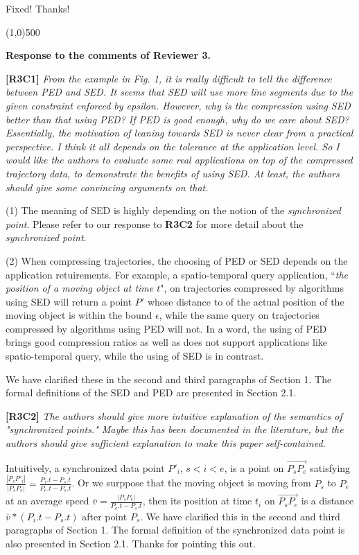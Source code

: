 \documentclass{letter}
\begin{document}
Fixed! Thanks!


\line(1,0){500}

\textbf{Response to the comments of Reviewer 3.}

\textbf{[R3C1]} \emph{From the example in Fig. 1, it is really difficult to tell the difference between PED and SED. It seems that SED will use more line segments due to the given constraint enforced by epsilon. However, why is the compression using SED better than that using PED? If PED is good enough, why do we care about SED? Essentially, the motivation of leaning towards SED is never clear from a practical perspective. I think it all depends on the tolerance at the application level. So I would like the authors to evaluate some real applications on top of the compressed trajectory data, to demonstrate the benefits of using SED. At least, the authors should give some convincing arguments on that.}

(1) The meaning of SED is highly depending on the notion of the \emph{synchronized point}. Please refer to our response to \textbf{R3C2} for more detail about the \emph{synchronized point}. 

(2) When compressing trajectories, the choosing of PED or SED depends on the application retuirements. For example, a spatio-temporal query application, ``\emph{the position of a moving object at time $t$}", on trajectories compressed by algorithms using SED will return a point $P'$ whose distance to of the actual position of the moving object is within the bound $\epsilon$, while the same query on trajectories compressed by algorithms using PED will not. In a word, the using of PED brings good compression ratios as well as does not support applications like spatio-temporal query, while the using of SED is in contrast.

We have clarified these in the second and third paragraphs of Section 1. 
The formal definitions of the SED and PED are presented in Section 2.1.


\textbf{[R3C2]} \emph{The authors should give more intuitive explanation of the semantics of "synchronized points." Maybe this has been documented in the literature, but the authors should give sufficient explanation to make this paper self-contained.}

Intuitively, a synchronized data point $P'_i$, $s<i<e$, is a point on $\overrightarrow{P_sP_{e}}$ satisfying $\frac{|P_sP'_i|}{|P_sP_e|} = \frac{P_i.t - P_s.t}{P_e.t-P_s.t}$. 
Or we surppose that the moving object is moving from $P_s$ to $P_e$ at an average speed $\overline{v} = \frac{|P_sP_e|}{P_e.t-P_s.t}$, then its position at time $t_i$ on $\overrightarrow{P_sP_{e}}$ is a distance $\overline{v}*(P_i.t-P_s.t)$ after point $P_s$.
We have clarified this in the second and third paragraphs of Section 1. The formal definition of the synchronized data point is also presented in Section 2.1.
Thanks for pointing this out.
\end{document}
